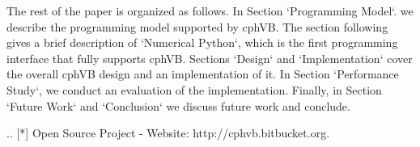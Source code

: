 The rest of the paper is organized as follows. In Section `Programming Model`. we describe the programming model supported by cphVB. The section following gives a brief description of `Numerical Python`, which is the first programming interface that fully supports cphVB. Sections `Design` and `Implementation` cover the overall cphVB design and an implementation of it. In Section `Performance Study`, we conduct an evaluation of the implementation. Finally, in Section `Future Work` and `Conclusion` we discuss future work and conclude.

.. [*] Open Source Project - Website: http://cphvb.bitbucket.org.

